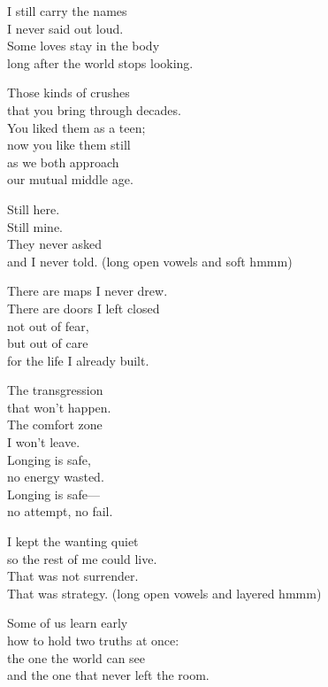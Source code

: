 \begin{lyrics}
I still carry the names\\
I never said out loud.\\
Some loves stay in the body\\
long after the world stops looking.

Those kinds of crushes\\
that you bring through decades.\\
You liked them as a teen;\\
now you like them still\\
as we both approach\\
our mutual middle age.

Still here.\\
Still mine.\\
They never asked\\
and I never told.
(long open vowels and soft hmmm)

There are maps I never drew.\\
There are doors I left closed\\
not out of fear,\\
but out of care\\
for the life I already built.

The transgression\\
that won’t happen.\\
The comfort zone\\
I won’t leave.\\
Longing is safe,\\
no energy wasted.\\
Longing is safe—\\
no attempt, no fail.

I kept the wanting quiet\\
so the rest of me could live.\\
That was not surrender.\\
That was strategy.
(long open vowels and layered hmmm)

Some of us learn early\\
how to hold two truths at once:\\
the one the world can see\\
and the one that never left the room.


\end{lyrics}
